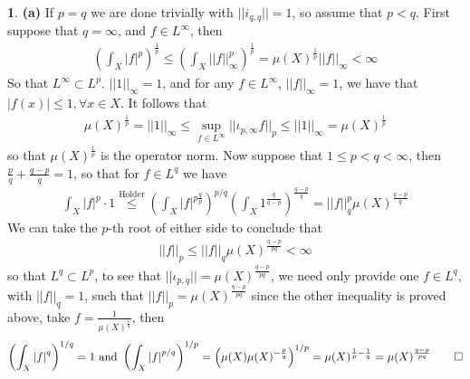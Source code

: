 \documentclass[10.5pt]{article}
\theoremstyle{definition}
\newtheorem{pb}{}
\newcommand{\abs}[1]{\left\vert#1\right\vert}
\newcommand{\norm}[1]{\lvert\lvert#1\rvert\rvert}
\newcommand{\tand}{\text{ and }}
\begin{document}
    \begin{pb}
        \textbf{(a)} If \(p = q\) we are done trivially with \(\norm{i_{q,q}} = 1\), so assume that \(p < q\). First suppose that \(q = \infty\), and \(f \in L^\infty\), then
        \begin{align*}
            \left(\int_X \abs{f}^p\right)^{\frac{1}{p}} \leq \left(\int_X \norm{f}_\infty^p\right)^{\frac{1}{p}} = \mu(X)^{\frac{1}{p}}\norm{f}_\infty < \infty
        \end{align*}
        So that \(L^\infty \subset L^p\). \(\norm{1}_\infty = 1\), and for any \(f \in L^\infty\), \(\norm{f}_\infty = 1\), we have that \(\abs{f(x)} \leq 1, \forall x \in X\). It follows that
        \begin{align*}
            \mu(X)^{\frac{1}{p}} = \norm{1}_\infty\leq \sup_{f \in L^\infty}\norm{\iota_{p,\infty}f}_p \leq \norm{1}_\infty = \mu(X)^{\frac{1}{p}}
        \end{align*}
        so that \(\mu(X)^{\frac{1}{p}}\) is the operator norm. Now suppose that \(1 \leq p < q < \infty\), then \(\frac{p}{q} + \frac{q - p}{q} = 1\), so that for \(f \in L^q\) we have
        \begin{align*}
            \int_X \abs{f}^p\cdot 1\overset{\text{Holder}}{\leq} \left(\int_X \abs{f}^{p\frac{q}{p}}\right)^{p/q}\left(\int_X 1^{\frac{q}{q-p}}\right)^{\frac{q-p}{q}} = \norm{f}_q^p\mu(X)^{\frac{q-p}{q}}
        \end{align*}
        We can take the \(p\)-th root of either side to conclude that
        \begin{align*}
            \norm{f}_p \leq \norm{f}_q\mu(X)^{\frac{q-p}{pq}} < \infty
        \end{align*}
        so that \(L^q \subset L^p\), to see that \(\norm{\iota_{p,q}} = \mu(X)^{\frac{q-p}{pq}}\), we need only provide one \(f \in L^q\), with \(\norm{f}_q = 1\), such that \(\norm{f}_p = \mu(X)^{\frac{q-p}{pq}}\) since the other inequality is proved above, take \(f = \frac{1}{\mu(X)^{\frac{1}{q}}}\), then
        \begin{align*}
            \left(\int_X \abs{f}^q\right)^{1/q} = 1 \tand \left(\int_X \abs{f}^{p/q}\right)^{1/p} = \left(\mu(X)\mu(X)^{-\frac{p}{q}}\right)^{1/p} = \mu(X)^{\frac{1}{p} - \frac{1}{q}} = \mu(X)^{\frac{q-p}{pq}} \qed
        \end{align*}


\end{pb}
\end{document}
